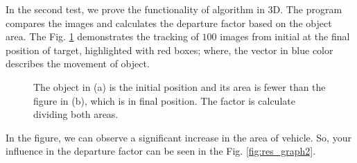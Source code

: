 In the second test, we prove the functionality of algorithm in 3D. 
The program compares the images and calculates the departure factor 
based on the object area. The Fig. \ref{fig:target} demonstrates the 
tracking of $100$ images from initial at the final position of target, 
highlighted with red boxes;
where, the vector in blue color describes the movement of object. 
\begin{figure}[!hbt]
\centering
  \caption{The object in (a) is the initial position and its area is 
  fewer than the figure in (b), which is in final position. 
  The factor is calculate dividing both areas.}
  \label{fig:target}
\end{figure}
In the figure, we can observe a significant increase in the area of vehicle. 
So, your influence in the departure factor can be seen in the Fig. \ref{fig:res_graph2}.

